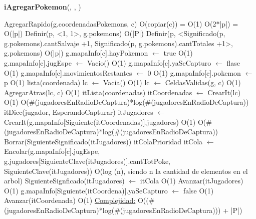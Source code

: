 \begin{Algoritmos}
\begin{algorithm}[H]{\textbf{iAgregarPokemon}(, , )}
	\begin{algorithmic}[1]
		\State AgregarRapido(g.coordenadasPokemons, c) \Comment O(copiar(c)) = O(1)
		 \Comment O(2$*$|p|) = O(|p|)
			\State Definir(p, <1, 1>, g.pokemons) \Comment O(|P|)
		\Else
			\State Definir(p, <Significado(p, g.pokemons).cantSalvaje +1, Significado(p, g.pokemons).cantTotales +1>, g.pokemons) \Comment O(|p|)
		\EndIf
		\State g.mapaInfo[c].hayPokemon $\gets$ true \Comment O(1)
		\State g.mapaInfo[c].jugEspe $\gets$ Vacio() \Comment O(1)
		\State g.mapaInfo[c].yaSeCapturo $\gets$ flase \Comment O(1)
 		\State g.mapaInfo[c].movimientosRestantes $\gets$ 0 \Comment O(1)
 		\State g.mapaInfo[c].pokemon $\gets$ p \Comment O(1)
		\State lista(coordenada) lc $\gets$ Vacia() \Comment O(1)
		\State lc $\gets$ CeldasValidas(g, c) \Comment O(1)
		\State AgregarAtras(lc, c) \Comment O(1)
		\State itLista(coordenadas) itCoordenadas $\gets$ CrearIt(lc) \Comment O(1)
		 \Comment O($\#$(jugadoresEnRadioDeCaptura)*log($\#$(jugadoresEnRadioDeCaptura))
			\State itDicc(jugador, EsperandoCapturar) itJugadores $\gets$ CrearIt(g.mapaInfo[Siguiente(itCoordenadas)].jugadores) \Comment O(1)
			 \Comment O($\#$(jugadoresEnRadioDeCaptura)*log($\#$(jugadoresEnRadioDeCaptura))
					\State Borrar(SiguienteSignificado(itJugadores))				
				\EndIf
				\State itColaPrioridad itCola $\gets$ Encolar(g.mapaInfo[c].jugEspe, g.jugadores[SiguienteClave(itJugadores)].cantTotPoke, SiguienteClave(itJugadores)) \Comment O(log (n), siendo n la cantidad de elementos en el arbol)
				\State SiguienteSignficado(itJugadores) $\gets$ itCola \Comment O(1)
				\State Avanzar(itJugadores) \Comment O(1)
			\EndWhile
				\State g.mapaInfo[Siguiente(itCoordena)].yaSeCapturo $\gets$ false \Comment O(1)			
			\EndIf
			\State Avanzar(itCoordenada) \Comment O(1)
		\EndWhile
		\medskip
		\Statex \underline{Complejidad:} O(($\#$(jugadoresEnRadioDeCaptura)*log($\#$(jugadoresEnRadioDeCaptura))) + |P|)

\end{algorithmic}
\end{algorithm}
\end{Algoritmos}
